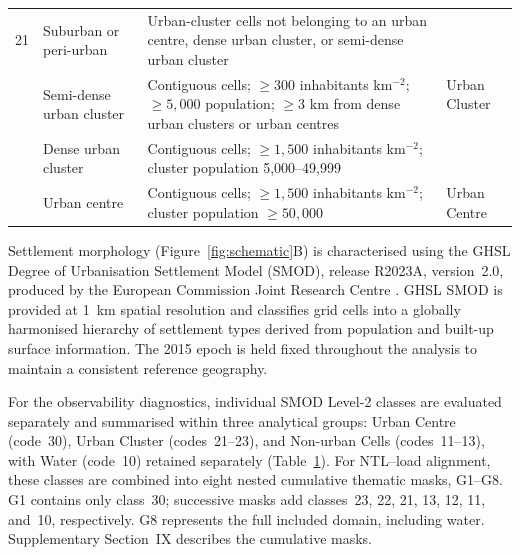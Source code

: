 \documentclass[]{interact}
\theoremstyle{plain}%
\theoremstyle{definition}
\theoremstyle{remark}
\begin{document}
\begin{table}[!h]
{\begin{tabularx}{\linewidth}{l l >{\raggedright\arraybackslash}X l}
            \midrule
            \cellcolor[HTML]{FFFF00}21
            & Suburban or peri-urban
            & Urban-cluster cells not belonging to an urban centre, dense urban cluster, or semi-dense urban cluster
            & \multirow{3}{*}{Urban Cluster} \\
            \cellcolor[HTML]{A87000}\textcolor{white}{22}
            & Semi-dense urban cluster
            & Contiguous cells; $\geq300$ inhabitants km$^{-2}$; $\geq5,000$ population; $\geq3$ km from dense urban clusters or urban centres
            & \\
            \cellcolor[HTML]{732600}\textcolor{white}{23}
            & Dense urban cluster
            & Contiguous cells; $\geq1,500$ inhabitants km$^{-2}$; cluster population 5,000--49,999
            & \\
            \midrule
            \cellcolor[HTML]{FF0000}\textcolor{white}{30}
            & Urban centre
            & Contiguous cells; $\geq1,500$ inhabitants km$^{-2}$; cluster population $\geq50,000$
            & Urban Centre \\
            \bottomrule
        \end{tabularx}
        }
        \label{tab:smod}
    \end{table}
    
    Settlement morphology (Figure~\ref{fig:schematic}B) is characterised using the GHSL Degree of Urbanisation Settlement Model (SMOD), release R2023A, version~2.0, produced by the European Commission Joint Research Centre \citep{Schiavina2023_GHSL_SMOD}. GHSL SMOD is provided at 1~km spatial resolution and classifies grid cells into a globally harmonised hierarchy of settlement types derived from population and built-up surface information. The 2015 epoch is held fixed throughout the analysis to maintain a consistent reference geography.
    
    For the observability diagnostics, individual SMOD Level-2 classes are evaluated separately and summarised within three analytical groups: Urban Centre (code~30), Urban Cluster (codes~21--23), and Non-urban Cells (codes~11--13), with Water (code~10) retained separately (Table~\ref{tab:smod}). For NTL--load alignment, these classes are combined into eight nested cumulative thematic masks, G1--G8. G1 contains only class~30; successive masks add classes~23, 22, 21, 13, 12, 11, and~10, respectively. G8 represents the full included domain, including water. Supplementary Section~IX describes the cumulative masks.
    
\end{document}
